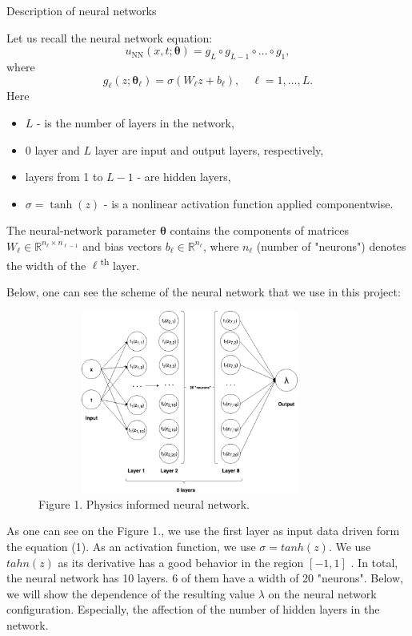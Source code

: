 \documentclass{beamer}
\def\\{}%
\renewcommand{\vec}[1]{\boldsymbol{#1}}
\newcommand{\VTheta}{\ensuremath{\vec{\theta}}}
\newcommand{\R}{\mathbb R}
\newcommand{\UNN}[1][\text{NN}]{u_{#1}}
\begin{document}
\begin{frame}{Description of neural networks}
    
Let us recall the neural network equation:
$$
\UNN(x, t; \vec{\theta}) = g_L \circ g_{L-1} \circ \dots \circ g_1,
$$
where
\[
    g_\ell(z; \VTheta_\ell) = \sigma (W_\ell z + b_\ell), \quad \ell = 1,\dots,L.
\]
Here 
\begin{itemize}
    \item $L$  - is the number of layers in the network,
    \item 0 layer and $L$ layer are input and output layers, respectively,
    \item layers from 1 to $L-1$ - are hidden layers,
    \item $\sigma = \tanh (z) $ - is a nonlinear activation function applied componentwise.
\end{itemize} 
 
The neural-network parameter $\VTheta$ contains the components of matrices
$W_\ell \in \R^{n_{\ell}\times n_{\ell-1}}$ and bias vectors
$b_\ell \in \R^{n_\ell}$, where $n_\ell$  (number of "neurons") denotes the width of the
$\ell$\textsuperscript{th} layer.
    
\end{frame}

\begin{frame}

Below, one can see the scheme of the neural network that we use in this project:
\begin{figure}
\centering
\includegraphics[width = 10cm , height = 6cm]{images/NN_scheme.png}
\\
\caption{Figure 1. Physics informed neural network.}
\end{figure}
\end{frame}

\begin{frame}

As one can see on the Figure 1., we use the first layer as input data driven
form the equation (1). As an activation function, we use $\sigma = tanh(z)$. We
use $tahn(z)$ as its derivative has a good behavior in the region $[-1, 1]$
\cite{nndesign}. In total, the neural network has 10 layers. 6 of them have a
width of 20 "neurons". Below, we will show the dependence of the resulting value
$\lambda$ on the neural network configuration. Especially, the affection of the
number of hidden layers in the network.
    
\end{frame}
\end{document}
